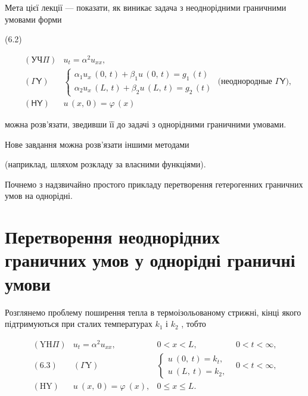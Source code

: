 \documentclass[
  ukrainian,
]{article}
\begin{document}
Мета цієї лекції --- показати, як виникає задача з неоднорідними
граничними умовами форми

(6.2)

\[
\begin{aligned} & (\mathsf{У}\mathsf{Ч}\Pi) & u_t = \alpha^2 u_{xx}, \\ & (\mathsf{\Gamma}\mathsf{Y}) & \begin{cases} \alpha_1 u_x \, (0, \, t) + \beta_1 u \, (0, \, t) = g_1 \, (t) \\ \alpha_2 u_x \, (L, \, t) + \beta_2 u \, (L, \, t) = g_2 \, (t) \end{cases} \text{ (неоднородные } \mathsf{\Gamma}\mathsf{Y}), \\ & (\mathsf{H}\mathsf{Y}) & u \, (x, \, 0) = \varphi \, (x) \end{aligned}
\]

можна розв'язати, зведивши її до задачі з однорідними граничними
умовами.

Нове завдання можна розв'язати іншими методами

(наприклад, шляхом розкладу за власними функціями).

Почнемо з надзвичайно простого прикладу перетворення гетерогенних
граничних умов на однорідні.

\section{Перетворення неоднорідних граничних умов у однорідні граничні
умови}\label{ux43fux435ux440ux435ux442ux432ux43eux440ux435ux43dux43dux44f-ux43dux435ux43eux434ux43dux43eux440ux456ux434ux43dux438ux445-ux433ux440ux430ux43dux438ux447ux43dux438ux445-ux443ux43cux43eux432-ux443-ux43eux434ux43dux43eux440ux456ux434ux43dux456-ux433ux440ux430ux43dux438ux447ux43dux456-ux443ux43cux43eux432ux438-1}

Розглянемо проблему поширення тепла в термоізольованому стрижні, кінці
якого підтримуються при сталих температурах \(k_1\) і \(k_2\) , тобто

\[
\begin{array}{lll} (\mathrm{Y}\mathrm{H}\Pi) & u_t = \alpha^2 u_{xx}, & 0 < x < L, & 0 < t < \infty, \\ (6.3) & (\Gamma\mathrm{Y}) & \begin{cases} u \ (0, \ t) = k_t, \\ u \ (L, \ t) = k_2, \end{cases} & 0 < t < \infty, \\ (\mathrm{H}\mathrm{Y}) & u \ (x, \ 0) = \varphi \ (x), & 0 \leqslant x \leqslant L. \end{array}
\]
\end{document}
